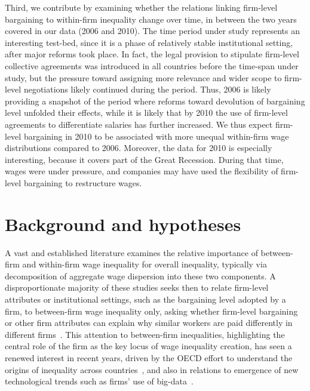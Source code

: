 \documentclass[12pt]{article}
\begin{document}
Third, we contribute by examining whether the relations linking firm-level bargaining to within-firm inequality change over time, in between the two years covered in our data (2006 and 2010). The time period under study represents an interesting test-bed, since it is a phase of relatively stable institutional setting, after major reforms took place. In fact, the legal provision to stipulate firm-level collective agreements was introduced in all countries before the time-span under study, but the pressure toward assigning more relevance and wider scope to firm-level negotiations likely continued during the period. Thus, 2006 is likely providing a snapshot of the period where reforms toward devolution of bargaining level unfolded their effects, while it is likely that by 2010 the use of firm-level agreements to differentiate salaries has further increased. We thus expect firm-level bargaining in 2010 to be associated with more unequal within-firm wage distributions compared to 2006. Moreover, the data for 2010 is especially interesting, because it covers part of the Great Recession. During that time, wages were under pressure, and companies may have used the flexibility of firm-level bargaining to restructure wages.



\section{Background and hypotheses}
\label{sec:background}

A vast and established literature examines the relative importance of between-firm and within-firm wage inequality for overall inequality, typically via decomposition of aggregate wage dispersion into these two components. A disproportionate majority of these studies seeks then to relate firm-level attributes or institutional settings, such as the bargaining level adopted by a firm, to between-firm wage inequality only, asking whether firm-level bargaining or other firm attributes can explain why similar workers are paid differently in different firms~\citep{dellaringa.lucifora.1994,hibbs.locking.1996,palenzuela.jimeno.1996,hartog.leuven.ea.2002,rycx.2003,cardoso.portugal.2005,checchi.pagani.2005,plasman.rusinek.ea.2007,card.delarica.2006,dellaringa.pagani.2007,daouli.demoussis.ea.2013,ehrl2017}. This attention to between-firm inequalities, highlighting the central role of the firm as the key locus of wage inequality creation, has seen a renewed interest in recent years, driven by the OECD effort to understand the origins of inequality across countries~\citep{criscuolo2020,criscuolo2021,criscuolo2023}, and also in relations to emergence of new technological trends such as firms' use of big-data~\citep{silva_etal2022}.
\end{document}
